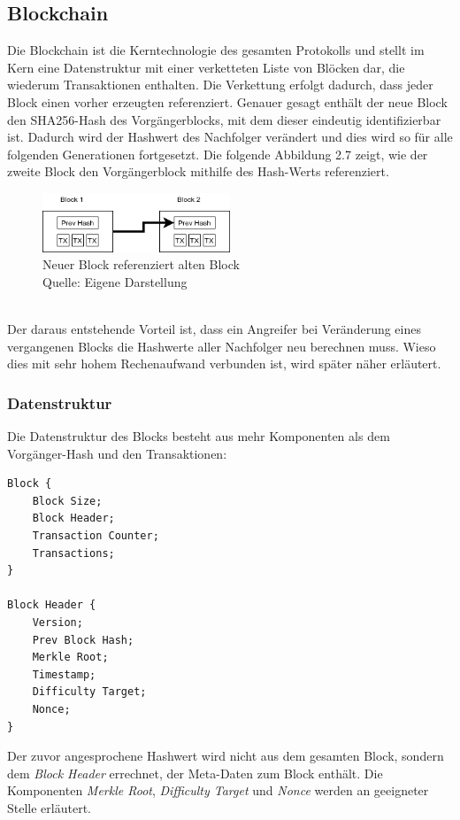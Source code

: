 \subsection{Blockchain}
Die Blockchain ist die Kerntechnologie des gesamten Protokolls und stellt im Kern eine Datenstruktur mit einer verketteten Liste von Blöcken dar, die wiederum Transaktionen enthalten. 
Die Verkettung erfolgt dadurch, dass jeder Block einen vorher erzeugten referenziert. 
Genauer gesagt enthält der neue Block den SHA256-Hash des Vorgängerblocks, mit dem dieser eindeutig identifizierbar ist. Dadurch wird der Hashwert des Nachfolger verändert und dies wird so für alle folgenden Generationen fortgesetzt. Die folgende Abbildung 2.7 zeigt, wie der zweite Block den Vorgängerblock mithilfe des Hash-Werts referenziert.
\begin{figure}[htpb]
	\centering
	\includegraphics[width=0.5\textwidth]{images/chain.png}
	\caption{Neuer Block referenziert alten Block \\
	Quelle: Eigene Darstellung}
	\label{6braun:fig:chain}
\end{figure}\\

Der daraus entstehende Vorteil ist, dass ein Angreifer bei Veränderung eines vergangenen Blocks die Hashwerte aller Nachfolger neu berechnen muss. Wieso dies mit sehr hohem Rechenaufwand verbunden ist, wird später näher erläutert.

\subsubsection{Datenstruktur}
Die Datenstruktur des Blocks besteht aus mehr Komponenten als dem Vorgänger-Hash und den Transaktionen:
\begin{lstlisting}[mathescape, caption={Datenstruktur des Blocks},captionpos=b]
Block {
	Block Size;
	Block Header;
	Transaction Counter;
	Transactions;
}

Block Header {
	Version;
	Prev Block Hash;
	Merkle Root;
	Timestamp;
	Difficulty Target;
	Nonce;
}
\end{lstlisting}
Der zuvor angesprochene Hashwert wird nicht aus dem gesamten Block, sondern dem \emph{Block Header} errechnet, der Meta-Daten zum Block enthält. Die Komponenten \emph{Merkle Root}, \emph{Difficulty Target} und \emph{Nonce} werden an geeigneter Stelle erläutert.\\

